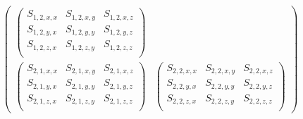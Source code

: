 \begin{equation}
\begin{gathered}
\begin{pmatrix}
\begin{pmatrix}
            S_{1, 2, x, x} & S_{1, 2, x, y} & S_{1, 2, x, z} \\
            S_{1, 2, y, x} & S_{1, 2, y, y} & S_{1, 2, y, z} \\
            S_{1, 2, z, x} & S_{1, 2, z, y} & S_{1, 2, z, z} \\
        \end{pmatrix}
        \\
        \begin{pmatrix}
            S_{2, 1, x, x} & S_{2, 1, x, y} & S_{2, 1, x, z} \\
            S_{2, 1, y, x} & S_{2, 1, y, y} & S_{2, 1, y, z} \\
            S_{2, 1, z, x} & S_{2, 1, z, y} & S_{2, 1, z, z} \\
        \end{pmatrix}
        &
        \begin{pmatrix}
            S_{2, 2, x, x} & S_{2, 2, x, y} & S_{2, 2, x, z} \\
            S_{2, 2, y, x} & S_{2, 2, y, y} & S_{2, 2, y, z} \\
            S_{2, 2, z, x} & S_{2, 2, z, y} & S_{2, 2, z, z} \\
        \end{pmatrix}
    \end{pmatrix}
    \end{gathered}
    \label{eq:matrix_of_matrices}
\end{equation}

